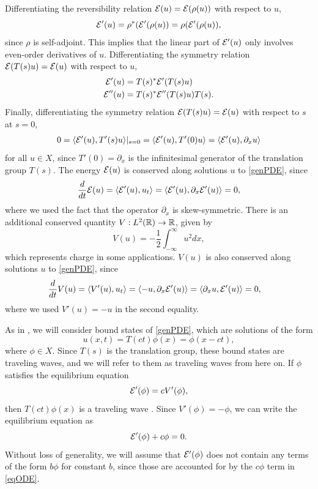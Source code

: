 \documentclass[11pt,reqno]{amsart}
\theoremstyle{plain}
\theoremstyle{definition}
\theoremstyle{remark}
\begin{document}
Differentiating the reversibility relation $\mathcal{E}(u) = \mathcal{E}(\rho(u))$ with respect to $u$,
\[
\mathcal{E}'(u) = \rho^*( \mathcal{E}'(\rho(u) ) = \rho( \mathcal{E}'(\rho(u) ),
\]
since $\rho$ is self-adjoint. This implies that the linear part of $\mathcal{E}'(u)$ only involves even-order derivatives of $u$. Differentiating the symmetry relation $\mathcal{E}(T(s)u) = \mathcal{E}(u)$ with respect to $u$,
\begin{align}
\mathcal{E}'(u) &= T(s)^* \mathcal{E}'(T(s)u) \label{Eprimesymm} \\
\mathcal{E}''(u) &= T(s)^* \mathcal{E}''(T(s)u) T(s). \label{EHessiansymm}
\end{align}
Finally, differentiating the symmetry relation $\mathcal{E}(T(s)u) = \mathcal{E}(u)$ with respect to $s$ at $s = 0$, 
\begin{align*}
0 = \langle \mathcal{E}'(u), T'(s) u \rangle|_{s = 0}
= \langle \mathcal{E}'(u), T'(0) u \rangle
= \langle \mathcal{E}'(u), \partial_x u \rangle
\end{align*}
for all $u \in X$, since $T'(0) = \partial_x$ is the infinitesimal generator of the translation group $T(s)$. The energy $\mathcal{E}(u)$ is conserved along solutions $u$ to \cref{genPDE}, since
\[
\frac{d}{dt}\mathcal{E}(u) = \langle \mathcal{E}'(u), u_t \rangle = \langle \mathcal{E}'(u), \partial_x \mathcal{E}'(u) \rangle = 0,
\]
where we used the fact that the operator $\partial_x$ is skew-symmetric. There is an additional conserved quantity $V: L^2(\mathbb{R}) \rightarrow \mathbb{R}$, given by
\begin{equation}\label{defV}
V(u) = -\frac{1}{2} \int_{-\infty}^\infty u^2 dx,
\end{equation}
which represents charge in some applications. $V(u)$ is also conserved along solutions $u$ to \cref{genPDE}, since
\begin{align*}
\frac{d}{dt}V(u) &= \langle V'(u), u_t \rangle
= \langle -u, \partial_x \mathcal{E}'(u) \rangle 
= \langle \partial_x u, \mathcal{E}'(u) \rangle = 0,
\end{align*}
where we used $V'(u) = -u$ in the second equality.

As in \cite{Grillakis1987}, we will consider bound states of \cref{genPDE}, which are solutions of the form
\begin{equation}
u(x, t) = T(ct)\phi(x) = \phi(x - ct),
\end{equation}
where $\phi \in X$. Since $T(s)$ is the translation group, these bound states are traveling waves, and we will refer to them as traveling waves from here on. If $\phi$ satisfies the equilibrium equation
\begin{equation}\label{eqODE1}
\mathcal{E}'(\phi) = c V'(\phi),
\end{equation}
then $T(ct)\phi(x)$ is a traveling wave \cite{Grillakis1987}. Since $V'(\phi) = -\phi$, we can write the equilibrium equation as
\begin{equation}\label{eqODE}
\mathcal{E}'(\phi) + c \phi = 0.
\end{equation}
Without loss of generality, we will assume that $\mathcal{E}'(\phi)$ does not contain any terms of the form $b\phi$ for constant $b$, since those are accounted for by the $c \phi$ term in \cref{eqODE}.
\end{document}
